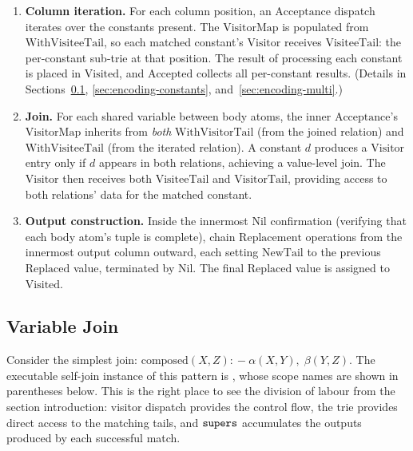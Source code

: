 \begin{enumerate}
  \item \textbf{Column iteration.}
    For each column position, an $\mathrm{Acceptance}$ dispatch
    iterates over the constants present.
    The $\mathrm{VisitorMap}$ is populated from
    $\mathrm{WithVisiteeTail}$, so each matched constant's
    $\mathrm{Visitor}$ receives $\mathrm{VisiteeTail}$: the
    per-constant sub-trie at that position.
    The result of processing each constant is placed in
    $\mathrm{Visited}$, and $\mathrm{Accepted}$ collects all
    per-constant results.
    (Details in Sections~\ref{sec:encoding-variables},
    \ref{sec:encoding-constants}, and~\ref{sec:encoding-multi}.)

  \item \textbf{Join.}
    For each shared variable between body atoms, the inner
    $\mathrm{Acceptance}$'s $\mathrm{VisitorMap}$ inherits from
    \emph{both} $\mathrm{WithVisitorTail}$ (from the joined
    relation) and $\mathrm{WithVisiteeTail}$ (from the iterated
    relation).
    A constant $d$ produces a $\mathrm{Visitor}$ entry only if
    $d$ appears in both relations, achieving a value-level
    join.
    The $\mathrm{Visitor}$ then receives both
    $\mathrm{VisiteeTail}$ and $\mathrm{VisitorTail}$,
    providing access to both relations' data for the
    matched constant.

  \item \textbf{Output construction.}
    Inside the innermost $\mathrm{Nil}$ confirmation (verifying
    that each body atom's tuple is complete), chain
    $\mathrm{Replacement}$ operations from the innermost
    output column outward, each setting $\mathrm{NewTail}$ to
    the previous $\mathrm{Replaced}$ value, terminated by
    $\mathrm{Nil}$.
    The final $\mathrm{Replaced}$ value is assigned to
    $\mathrm{Visited}$.
\end{enumerate}

\subsection{Variable Join}
\label{sec:encoding-variables}

Consider the simplest join:
$\mathrm{composed}(X, Z) \mathrel{{:}\!{-}} \alpha(X, Y),\; \beta(Y, Z)$.
The executable self-join instance of this pattern is
,
whose scope names are shown in parentheses below.
This is the right place to see the division of labour from the
section introduction: visitor dispatch provides the control flow,
the trie provides direct access to the matching tails, and
$\mathtt{supers}$ accumulates the outputs produced by each successful
match.

